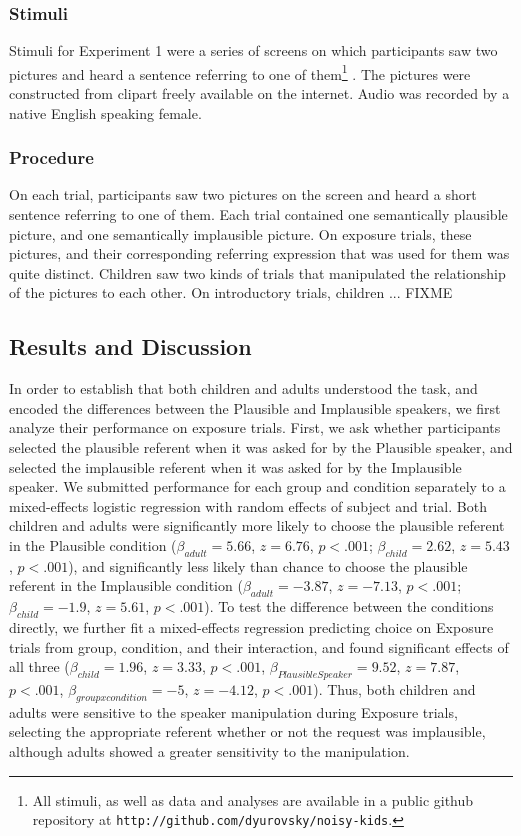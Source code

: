\documentclass[man,floatsintext]{apa6}
\begin{document}
\subsubsection{Stimuli}

Stimuli for Experiment 1 were a series of screens on which participants saw two pictures and heard a sentence referring to one of them\footnote{All stimuli, as well as data and analyses are available in a public github repository at \small{\tt{http://github.com/dyurovsky/noisy-kids}}.} . The pictures were constructed from clipart freely available on the internet. Audio was recorded by a native English speaking female. 

\subsubsection{Procedure}

On each trial, participants saw two pictures on the screen and heard a short sentence referring to one of them. Each trial contained one semantically plausible picture, and one semantically implausible picture. On exposure trials, these pictures, and their corresponding referring expression that was used for them was quite distinct. Children saw two kinds of trials that manipulated the relationship of the pictures to each other. On introductory trials, children ... FIXME

\subsection{Results and Discussion}

In order to establish that both children and adults understood the task, and encoded the differences between the Plausible and Implausible speakers, we first analyze their performance on exposure trials. First, we ask whether participants selected the plausible referent when it was asked for by the Plausible speaker, and selected the implausible referent when it was asked for by the Implausible speaker. We submitted performance for each group and condition separately to a mixed-effects logistic regression with random effects of subject and trial. Both children and adults were significantly more likely to choose the plausible referent in the Plausible condition ($\beta_{adult} = 5.66$, $z = 6.76$, $p <.001$; $\beta_{child} = 2.62$, $z = 5.43$, $p <.001$), and significantly less likely than chance to choose the plausible referent in the Implausible condition ($\beta_{adult} = -3.87$, $z = -7.13$, $p <.001$; $\beta_{child} = -1.9$, $z = 5.61$, $p <.001$). To test the difference between the conditions directly, we further fit a mixed-effects regression predicting choice on Exposure trials from group, condition, and their interaction, and found significant effects of all three ($\beta_{child} = 1.96$,  $z = 3.33$, $p <.001$, $\beta_{Plausible Speaker} = 9.52$,  $z = 7.87$, $p <.001$,  $\beta_{group x condition} = -5$,  $z = -4.12$, $p <.001$). Thus, both children and adults were sensitive to the speaker manipulation during Exposure trials, selecting the appropriate referent whether or not the request was implausible, although adults showed a greater sensitivity to the manipulation.
\end{document}
